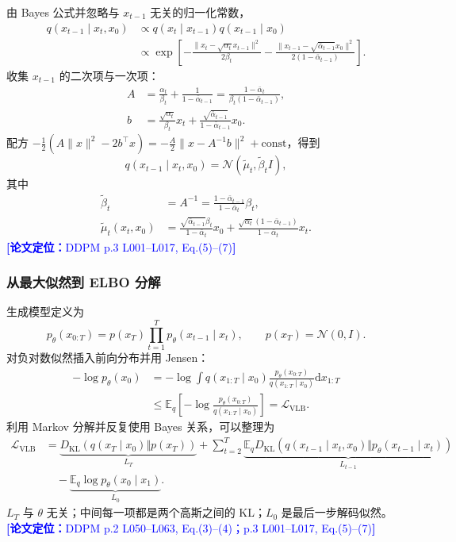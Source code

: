 \documentclass[11pt,a4paper]{ctexart}
\newcommand{\paperref}[1]{\textcolor{Blue}{\footnotesize\textbf{[论文定位：}#1\textbf{]}}}
\newcommand{\E}{\mathbb{E}}
\newcommand{\N}{\mathcal{N}}
\newcommand{\KL}{D_{\mathrm{KL}}}
\newcommand{\dd}{\mathrm{d}}
\begin{document}
由 Bayes 公式并忽略与 $x_{t-1}$ 无关的归一化常数，
\begin{align}
q(x_{t-1}\mid x_t,x_0)
&\propto q(x_t\mid x_{t-1})q(x_{t-1}\mid x_0)\\
&\propto \exp\left[-\frac{\|x_t-\sqrt{\alpha_t}x_{t-1}\|^2}{2\beta_t}
-\frac{\|x_{t-1}-\sqrt{\bar\alpha_{t-1}}x_0\|^2}{2(1-\bar\alpha_{t-1})}\right].
\end{align}
收集 $x_{t-1}$ 的二次项与一次项：
\begin{align}
A&=\frac{\alpha_t}{\beta_t}+\frac{1}{1-\bar\alpha_{t-1}}
=\frac{1-\bar\alpha_t}{\beta_t(1-\bar\alpha_{t-1})},\\
b&=\frac{\sqrt{\alpha_t}}{\beta_t}x_t
+\frac{\sqrt{\bar\alpha_{t-1}}}{1-\bar\alpha_{t-1}}x_0.
\end{align}
配方 $-\tfrac12(A\|x\|^2-2b^\top x)=-\tfrac A2\|x-A^{-1}b\|^2+\mathrm{const}$，得到
\begin{equation}
q(x_{t-1}\mid x_t,x_0)=\N(\tilde\mu_t,\tilde\beta_t I),
\end{equation}
其中
\begin{align}
\tilde\beta_t&=A^{-1}=\frac{1-\bar\alpha_{t-1}}{1-\bar\alpha_t}\beta_t,\\
\tilde\mu_t(x_t,x_0)
&=\frac{\sqrt{\bar\alpha_{t-1}}\beta_t}{1-\bar\alpha_t}x_0
+\frac{\sqrt{\alpha_t}(1-\bar\alpha_{t-1})}{1-\bar\alpha_t}x_t.
\end{align}
\paperref{DDPM p.3 L001--L017, Eq.(5)--(7)}

\subsubsection*{从最大似然到 ELBO 分解}

生成模型定义为
\begin{equation}
p_\theta(x_{0:T})=p(x_T)\prod_{t=1}^T p_\theta(x_{t-1}\mid x_t),\qquad p(x_T)=\N(0,I).
\end{equation}
对负对数似然插入前向分布并用 Jensen：
\begin{align}
-\log p_\theta(x_0)
&=-\log\int q(x_{1:T}\mid x_0)
\frac{p_\theta(x_{0:T})}{q(x_{1:T}\mid x_0)}\dd x_{1:T}\\
&\le \E_q\left[-\log\frac{p_\theta(x_{0:T})}{q(x_{1:T}\mid x_0)}\right]
=\mathcal L_{\mathrm{VLB}}.
\end{align}
利用 Markov 分解并反复使用 Bayes 关系，可以整理为
\begin{align}
\mathcal L_{\mathrm{VLB}}
&=\underbrace{\KL(q(x_T\mid x_0)\Vert p(x_T))}_{L_T}
+\sum_{t=2}^{T}\underbrace{\E_q\KL(q(x_{t-1}\mid x_t,x_0)\Vert p_\theta(x_{t-1}\mid x_t))}_{L_{t-1}}\\
&\quad-\underbrace{\E_q\log p_\theta(x_0\mid x_1)}_{L_0}.
\end{align}
$L_T$ 与 $\theta$ 无关；中间每一项都是两个高斯之间的 KL；$L_0$ 是最后一步解码似然。
\paperref{DDPM p.2 L050--L063, Eq.(3)--(4)；p.3 L001--L017, Eq.(5)--(7)}
\end{document}
